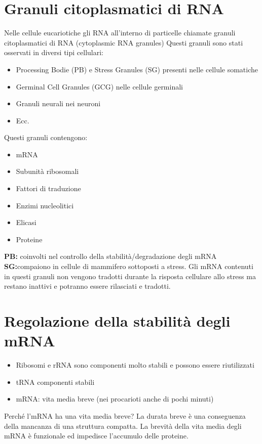 \documentclass{article}
\begin{document}
\section{Granuli citoplasmatici di RNA}
Nelle cellule eucariotiche gli RNA all'interno di particelle chiamate granuli citoplasmatici di RNA (cytoplasmic RNA
granules)
Questi granuli sono stati osservati in diversi tipi cellulari:
\begin{itemize}
    \item Processing Bodie (PB) e Stress Granules (SG) presenti nelle cellule somatiche
    \item Germinal Cell Granules (GCG) nelle cellule germinali
    \item Granuli neurali nei neuroni
    \item Ecc.
\end{itemize}
Questi granuli contengono:
\begin{itemize}
    \item mRNA
    \item Subunità ribosomali
    \item Fattori di traduzione
    \item Enzimi nucleolitici
    \item Elicasi
    \item Proteine
\end{itemize}
\textbf{PB:} coinvolti nel controllo della stabilità/degradazione degli mRNA\\
\textbf{SG:}compaiono in cellule di mammifero sottoposti a stress. Gli mRNA contenuti in questi granuli non vengono tradotti
durante la risposta cellulare allo stress ma restano inattivi e potranno essere rilasciati e tradotti.
\section{Regolazione della stabilità degli mRNA}
\begin{itemize}
    \item Ribosomi e rRNA sono componenti molto stabili e possono essere riutilizzati
    \item tRNA componenti stabili
    \item mRNA: vita media breve (nei procarioti anche di pochi minuti)
\end{itemize}
Perché l'mRNA ha una vita media breve? La durata breve è una conseguenza della mancanza di una
struttura compatta.
La brevità della vita media degli mRNA è funzionale ed impedisce l'accumulo delle proteine.
\end{document}
